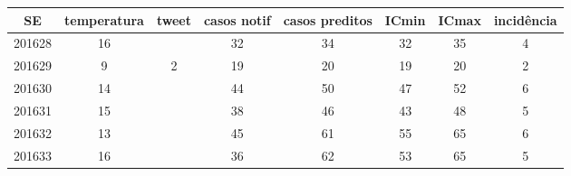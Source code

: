 \begin{tabular}{c|ccccccc}
  \hline
SE & temperatura & tweet & casos notif & casos preditos & ICmin & ICmax & incidência \\ 
  \hline
201628 & 16 &  & 32 & 34 & 32 & 35 & 4 \\ 
  201629 & 9 & 2 & 19 & 20 & 19 & 20 & 2 \\ 
  201630 & 14 &  & 44 & 50 & 47 & 52 & 6 \\ 
  201631 & 15 &  & 38 & 46 & 43 & 48 & 5 \\ 
  201632 & 13 &  & 45 & 61 & 55 & 65 & 6 \\ 
  201633 & 16 &  & 36 & 62 & 53 & 65 & 5 \\ 
   \hline
\end{tabular}
